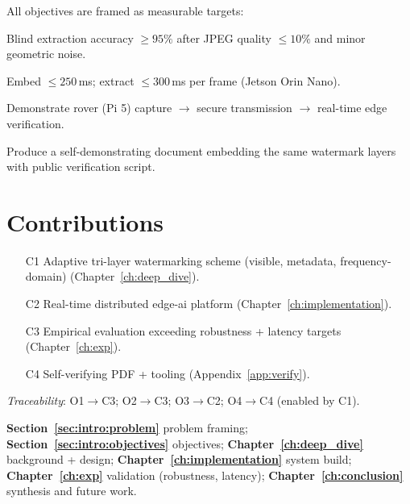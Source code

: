 All objectives are framed as measurable targets:

\begin{description}[leftmargin=3.2cm,style=sameline]
  \item[O1 Robustness] Blind extraction accuracy $\ge 95\%$ after JPEG quality $\le 10\%$ and minor geometric noise.
  \item[O2 Latency] Embed $\le 250$\,ms; extract $\le 300$\,ms per frame (Jetson Orin Nano).
  \item[O3 Integration] Demonstrate rover (Pi 5) capture $\rightarrow$ secure transmission $\rightarrow$ real-time edge verification.
  \item[O4 Verifiability] Produce a self-demonstrating document embedding the same watermark layers with public verification script.
\end{description}

\section{Contributions}
\label{sec:intro:contributions}

\begin{enumerate}
  \item[C1] Adaptive tri-layer watermarking scheme (visible, metadata, frequency-domain) (Chapter~\ref{ch:deep_dive}).
  \item[C2] Real-time distributed edge-\gls{ai} platform (Chapter~\ref{ch:implementation}).
  \item[C3] Empirical evaluation exceeding robustness + latency targets (Chapter~\ref{ch:exp}).
  \item[C4] Self-verifying PDF + tooling (Appendix~\ref{app:verify}).
\end{enumerate}

\noindent\textit{Traceability}: O1$\rightarrow$C3; O2$\rightarrow$C3; O3$\rightarrow$C2; O4$\rightarrow$C4 (enabled by C1).

\begin{roadmapbox}
\textbf{Section~\ref{sec:intro:problem}} problem framing; \textbf{Section~\ref{sec:intro:objectives}} objectives; \textbf{Chapter~\ref{ch:deep_dive}} background + design; \textbf{Chapter~\ref{ch:implementation}} system build; \textbf{Chapter~\ref{ch:exp}} validation (robustness, latency); \textbf{Chapter~\ref{ch:conclusion}} synthesis and future work.
\end{roadmapbox}

